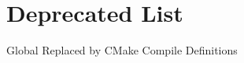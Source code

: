 \chapter{Deprecated List}
\hypertarget{deprecated}{}\label{deprecated}

\begin{DoxyRefList}
\item[Global \doxylink{global__constants_8h_a2098ddebdb26af02b8f4bcf35a665815}{x86\+\_\+\+GCC} ]\label{deprecated__deprecated000001}%
%
Replaced by CMake Compile Definitions 
\end{DoxyRefList}